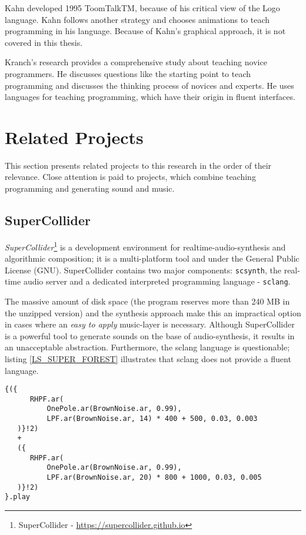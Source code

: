 Kahn developed 1995 ToomTalkTM, because of his critical view of the Logo language. Kahn follows another strategy and chooses animations to teach programming in his language. Because of Kahn's graphical approach, it is not covered in this thesis.\cite{Kahn1995}

Kranch's research provides a comprehensive study about teaching novice programmers.\cite{Kranch2012} He discusses questions like the starting point to teach programming and discusses the thinking process of novices and experts. He uses languages for teaching programming, which have their origin in fluent interfaces.

\section{Related Projects}
\label{LIT_PROJ}
This section presents related projects to this research in the order of their relevance. Close attention is paid to projects, which combine teaching programming and generating sound and music.

\subsection{SuperCollider}
\label{LIT_PROJ_SUPERCOLL}
\textit{SuperCollider}\footnote{SuperCollider - \url{https://supercollider.github.io}} is a development environment for realtime-audio-synthesis and algorithmic composition; it is a multi-platform tool and under the General Public License (GNU). SuperCollider contains two major components: \texttt{scsynth}, the real-time audio server and a dedicated interpreted programming language - \texttt{sclang}.\cite{SuperCollider}

The massive amount of disk space (the program reserves more than 240 MB in the unzipped version) and the synthesis approach make this an impractical option in cases where an \textit{easy to apply} music-layer is necessary. Although SuperCollider is a powerful tool to generate sounds on the base of audio-synthesis, it results in an unacceptable abstraction. Furthermore, the sclang language is questionable; listing \ref{LS_SUPER_FOREST} illustrates that sclang does not provide a fluent language.

\begin{lstlisting}[caption={SuperCollider's \texttt{sclang} Example: Forest Sound\cite{McCartney2007}}, label=LS_SUPER_FOREST]
{({
      RHPF.ar(
          OnePole.ar(BrownNoise.ar, 0.99),
          LPF.ar(BrownNoise.ar, 14) * 400 + 500, 0.03, 0.003
   )}!2)
   + 
   ({
      RHPF.ar(
          OnePole.ar(BrownNoise.ar, 0.99),
          LPF.ar(BrownNoise.ar, 20) * 800 + 1000, 0.03, 0.005
   )}!2)
}.play
\end{lstlisting}

